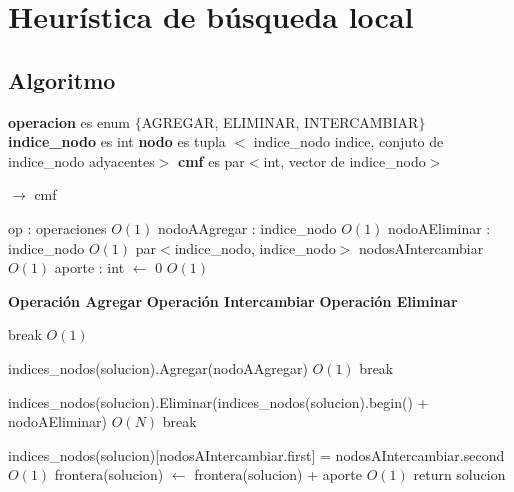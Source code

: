 \documentclass[a4paper, 10pt, twoside]{article}
\newenvironment{pseudo}[1][]{%
    \vspace{1em}%
    \begin{algorithmic}%
}
{%
    \end{algorithmic}%
    \vspace{1em}%
}
\newcommand{\Ode}[1]{\hfill $O(#1)$}
\begin{document}


\newpage

\section{Heurística de búsqueda local}
\subsection{Algoritmo}

\begin{pseudo}

\State \textbf{operacion} es enum $\lbrace$AGREGAR, ELIMINAR, INTERCAMBIAR$\rbrace$
\State \textbf{indice\_nodo} es int
\State \textbf{nodo} es tupla $<$ indice\_nodo indice, conjuto de indice\_nodo adyacentes$>$
\State \textbf{cmf} es par$<$int, vector de indice\_nodo$>$

\State
{} $\rightarrow$ cmf
	
	\State op : operaciones 																	\Ode{1}
	\State nodoAAgregar	: indice\_nodo 															\Ode{1}
	\State nodoAEliminar : indice\_nodo															\Ode{1}
	\State par$<$indice\_nodo, indice\_nodo$>$ nodosAIntercambiar								\Ode{1}
	\State aporte : int  $\leftarrow$ 0															\Ode{1}

	\State
	\State \textbf{Operación Agregar}
	\State
	\State \textbf{Operación Intercambiar}
	\State
	\State \textbf{Operación Eliminar}
	\State

	 break \EndIf																\Ode{1}

		    \State indices\_nodos(solucion).Agregar(nodoAAgregar)								\Ode{1}
		    \State break
	    \EndCase

		    \State indices\_nodos(solucion).Eliminar(indices\_nodos(solucion).begin() + nodoAEliminar)	\Ode{N}
		    \State break
	    \EndCase

		    \State indices\_nodos(solucion)[nodosAIntercambiar.first] = nodosAIntercambiar.second	\Ode{1}
	    \EndCase
	\EndSwitch
	\State
	\State frontera(solucion) $\leftarrow$ frontera(solucion) + aporte 							\Ode{1}
	\State return solucion


\end{pseudo}
\end{document}
